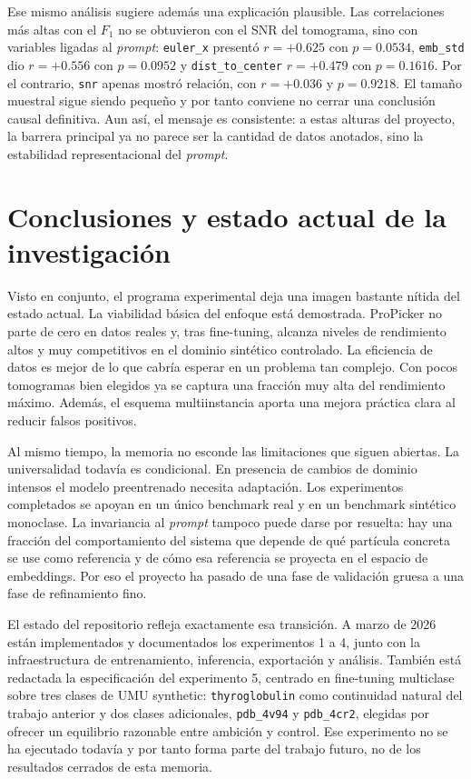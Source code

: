 \documentclass[12pt,a4paper]{report}
\begin{document}
Ese mismo análisis sugiere además una explicación plausible. Las correlaciones más altas con el \(F_1\) no se obtuvieron con el SNR del tomograma, sino con variables ligadas al \emph{prompt}: \texttt{euler\_x} presentó \(r=+0.625\) con \(p=0.0534\), \texttt{emb\_std} dio \(r=+0.556\) con \(p=0.0952\) y \texttt{dist\_to\_center} \(r=+0.479\) con \(p=0.1616\). Por el contrario, \texttt{snr} apenas mostró relación, con \(r=+0.036\) y \(p=0.9218\). El tamaño muestral sigue siendo pequeño y por tanto conviene no cerrar una conclusión causal definitiva. Aun así, el mensaje es consistente: a estas alturas del proyecto, la barrera principal ya no parece ser la cantidad de datos anotados, sino la estabilidad representacional del \emph{prompt}.

\section*{Conclusiones y estado actual de la investigación}
Visto en conjunto, el programa experimental deja una imagen bastante nítida del estado actual. La viabilidad básica del enfoque está demostrada. ProPicker no parte de cero en datos reales y, tras fine-tuning, alcanza niveles de rendimiento altos y muy competitivos en el dominio sintético controlado. La eficiencia de datos es mejor de lo que cabría esperar en un problema tan complejo. Con pocos tomogramas bien elegidos ya se captura una fracción muy alta del rendimiento máximo. Además, el esquema multiinstancia aporta una mejora práctica clara al reducir falsos positivos.

Al mismo tiempo, la memoria no esconde las limitaciones que siguen abiertas. La universalidad todavía es condicional. En presencia de cambios de dominio intensos el modelo preentrenado necesita adaptación. Los experimentos completados se apoyan en un único benchmark real y en un benchmark sintético monoclase. La invariancia al \emph{prompt} tampoco puede darse por resuelta: hay una fracción del comportamiento del sistema que depende de qué partícula concreta se use como referencia y de cómo esa referencia se proyecta en el espacio de embeddings. Por eso el proyecto ha pasado de una fase de validación gruesa a una fase de refinamiento fino.

El estado del repositorio refleja exactamente esa transición. A marzo de 2026 están implementados y documentados los experimentos 1 a 4, junto con la infraestructura de entrenamiento, inferencia, exportación y análisis. También está redactada la especificación del experimento 5, centrado en fine-tuning multiclase sobre tres clases de UMU synthetic: \texttt{thyroglobulin} como continuidad natural del trabajo anterior y dos clases adicionales, \texttt{pdb\_4v94} y \texttt{pdb\_4cr2}, elegidas por ofrecer un equilibrio razonable entre ambición y control. Ese experimento no se ha ejecutado todavía y por tanto forma parte del trabajo futuro, no de los resultados cerrados de esta memoria.
\end{document}
